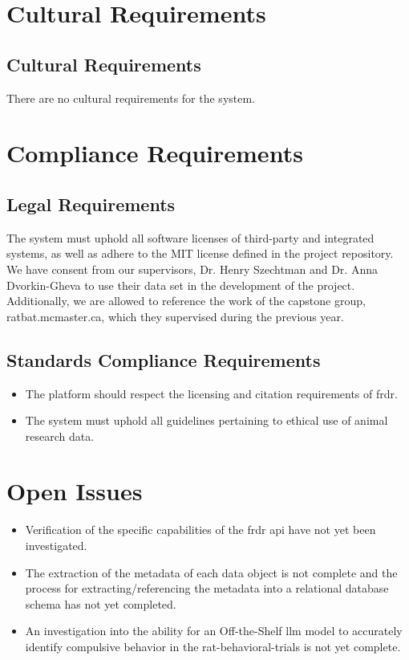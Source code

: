 \documentclass[12pt]{article}
\begin{document}
\section{Cultural Requirements}
\subsection{Cultural Requirements}
\par{There are no cultural requirements for the system.}

\section{Compliance Requirements}
\subsection{Legal Requirements}

\par{The system must uphold all software licenses of third-party and integrated systems, as well as adhere to the MIT license defined in the project repository. \newline \indent We have consent from our 
supervisors, Dr. Henry Szechtman and Dr. Anna Dvorkin-Gheva to use their data set in the development of the project. Additionally, 
we are allowed to reference the work of the capstone group, ratbat.mcmaster.ca, which they supervised during the previous year.}

\subsection{Standards Compliance Requirements}

\begin{itemize}
    \item The platform should respect the licensing and citation requirements of \gls{frdr}. 
    \item The system must uphold all guidelines pertaining to ethical use of animal research data.
\end{itemize}

\section{Open Issues}

\begin{itemize}
    \item Verification of the specific capabilities of the \gls{frdr} \gls{api} have not yet been investigated.
    \item The extraction of the metadata of each data object is not complete and the process for extracting/referencing the metadata
    into a relational database schema has not yet completed.
    \item An investigation into the ability for an Off-the-Shelf \gls{llm} model to accurately identify compulsive behavior in the
    \gls{rat-behavioral-trials} is not yet complete.
\end{itemize}
\end{document}

